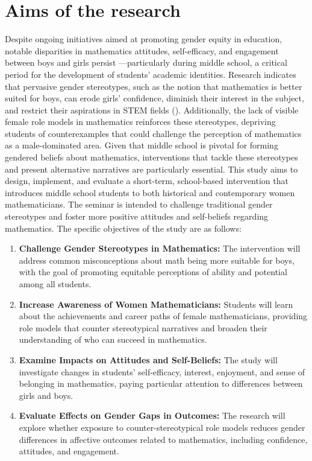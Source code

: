 \section{Aims of the research}
Despite ongoing initiatives aimed at promoting gender equity in education, notable disparities in mathematics attitudes, self-efficacy, and engagement between boys and girls persist —particularly during middle school, a critical period for the development of students' academic identities. Research indicates that pervasive gender stereotypes, such as the notion that mathematics is better suited for boys, can erode girls' confidence, diminish their interest in the subject, and restrict their aspirations in STEM fields (\cite{EcclesWigfield2020,Gunderson2012}). Additionally, the lack of visible female role models in mathematics reinforces these stereotypes, depriving students of counterexamples that could challenge the perception of mathematics as a male-dominated area. Given that middle school is pivotal for forming gendered beliefs about mathematics, interventions that tackle these stereotypes and present alternative narratives are particularly essential.
This study aims to design, implement, and evaluate a short-term, school-based intervention that introduces middle school students to both historical and contemporary women mathematicians. The seminar is intended to challenge traditional gender stereotypes and foster more positive attitudes and self-beliefs regarding mathematics. The specific objectives of the study are as follows:
\begin{enumerate}
    \item \textbf{Challenge Gender Stereotypes in Mathematics:} The intervention will address common misconceptions about math being more suitable for boys, with the goal of promoting equitable perceptions of ability and potential among all students.
    \item \textbf{Increase Awareness of Women Mathematicians:} Students will learn about the achievements and career paths of female mathematicians, providing role models that counter stereotypical narratives and broaden their understanding of who can succeed in mathematics.
    \item \textbf{Examine Impacts on Attitudes and Self-Beliefs:} The study will investigate changes in students' self-efficacy, interest, enjoyment, and sense of belonging in mathematics, paying particular attention to differences between girls and boys.
    \item \textbf{Evaluate Effects on Gender Gaps in Outcomes:} The research will explore whether exposure to counter-stereotypical role models reduces gender differences in affective outcomes related to mathematics, including confidence, attitudes, and engagement.
\end{enumerate}

